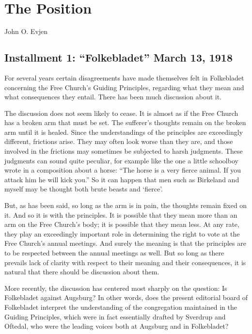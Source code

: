 
\section{The Position}

John  O. Evjen

\subsection{Installment 1: “Folkebladet” March 13, 1918}





For several years certain disagreements have made themselves felt in Folkebladet concerning the Free Church’s Guiding Principles, regarding what they mean and what consequences they entail. There has been much discussion about it.

The discussion does not seem likely to cease. It is almost as if the Free Church has a broken arm that must be set. The sufferer’s thoughts remain on the broken arm until it is healed. Since the understandings of the principles are exceedingly different, frictions arise. They may often look worse than they are, and those involved in the frictions may sometimes be subjected to harsh judgments. These judgments can sound quite peculiar, for example like the one a little schoolboy wrote in a composition about a horse: “The horse is a very fierce animal. If you attack him he will kick you.” So it can happen that men such as Birkeland and myself may be thought both brute beasts and ‘fierce’.

But, as has been said, so long as the arm is in pain, the thoughts remain fixed on it. And so it is with the principles. It is possible that they mean more than an arm on the Free Church’s body; it is possible that they mean less. At any rate, they play an exceedingly important role in determining the right to vote at the Free Church’s annual meetings. And surely the meaning is that the principles are to be respected between the annual meetings as well. But so long as there prevails lack of clarity with respect to their meaning and their consequences, it is natural that there should be discussion about them.

More recently, the discussion has centered most sharply on the question: Is Folkebladet against Augsburg? In other words, does the present editorial board of Folkebladet interpret the understanding of the congregation maintained in the Guiding Principles, which were in fact essentially drafted by Sverdrup and Oftedal, who were the leading voices both at Augsburg and in Folkebladet?

